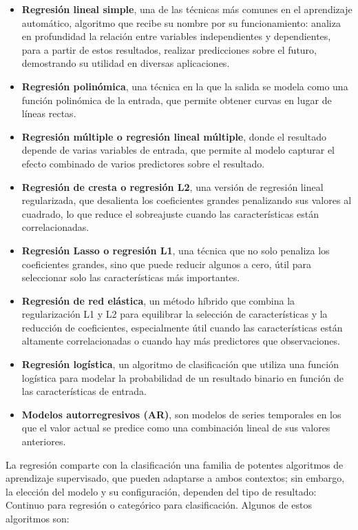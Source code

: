 \begin{itemize}
\item
  \textbf{Regresión lineal simple}, una de las técnicas más comunes en el aprendizaje automático, algoritmo que recibe su nombre por su funcionamiento: analiza en profundidad la relación entre variables independientes y dependientes, para a partir de estos resultados, realizar predicciones sobre el futuro, demostrando su utilidad en diversas aplicaciones.
\item
  \textbf{Regresión polinómica}, una técnica en la que la salida se modela como una función polinómica de la entrada, que permite obtener curvas en lugar de líneas rectas.
\item
  \textbf{Regresión múltiple o regresión lineal múltiple}, donde el resultado depende de varias variables de entrada, que permite al modelo capturar el efecto combinado de varios predictores sobre el resultado.
\item
  \textbf{Regresión de cresta o regresión L2}, una versión de regresión lineal regularizada, que desalienta los coeficientes grandes penalizando sus valores al cuadrado, lo que reduce el sobreajuste cuando las características están correlacionadas.
\item
  \textbf{Regresión Lasso o regresión L1}, una técnica que no solo penaliza los coeficientes grandes, sino que puede reducir algunos a cero, útil para seleccionar solo las características más importantes.
\item
  \textbf{Regresión de red elástica}, un método híbrido que combina la regularización L1 y L2 para equilibrar la selección de características y la reducción de coeficientes, especialmente útil cuando las características están altamente correlacionadas o cuando hay más predictores que observaciones.
\item
  \textbf{Regresión logística}, un algoritmo de clasificación que utiliza una función logística para modelar la probabilidad de un resultado binario en función de las características de entrada.
\item
  \textbf{Modelos autorregresivos (AR)}, son modelos de series temporales en los que el valor actual se predice como una combinación lineal de sus valores anteriores.
\end{itemize}

La regresión comparte con la clasificación una familia de potentes algoritmos de aprendizaje supervisado, que pueden adaptarse a ambos contextos; sin embargo, la elección del modelo y su configuración, dependen del tipo de resultado: Continuo para regresión o categórico para clasificación. Algunos de estos algoritmos son:

